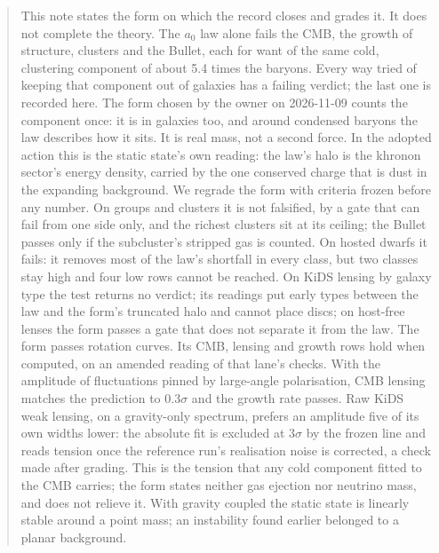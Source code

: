 \documentclass[10pt]{article}
\begin{document}
\begin{abstract}\noindent
This note states the form on which the record closes and grades it. It does not complete the theory.
The $a_0$ law alone fails the CMB, the growth of structure, clusters and the Bullet, each for want of the same cold, clustering component of about 5.4 times the baryons.
Every way tried of keeping that component out of galaxies has a failing verdict; the last one is recorded here.
The form chosen by the owner on 2026-11-09 counts the component once: it is in galaxies too, and around condensed baryons the law describes how it sits. It is real mass, not a second force.
In the adopted action this is the static state's own reading: the law's halo is the khronon sector's energy density, carried by the one conserved charge that is dust in the expanding background.
We regrade the form with criteria frozen before any number.
On groups and clusters it is not falsified, by a gate that can fail from one side only, and the richest clusters sit at its ceiling; the Bullet passes only if the subcluster's stripped gas is counted.
On hosted dwarfs it fails: it removes most of the law's shortfall in every class, but two classes stay high and four low rows cannot be reached.
On KiDS lensing by galaxy type the test returns no verdict; its readings put early types between the law and the form's truncated halo and cannot place discs; on host-free lenses the form passes a gate that does not separate it from the law.
The form passes rotation curves. Its CMB, lensing and growth rows hold when computed, on an amended reading of that lane's checks. With the amplitude of fluctuations pinned by large-angle polarisation, CMB lensing matches the prediction to 0.3$\sigma$ and the growth rate passes. Raw KiDS weak lensing, on a gravity-only spectrum, prefers an amplitude five of its own widths lower: the absolute fit is excluded at 3$\sigma$ by the frozen line and reads tension once the reference run's realisation noise is corrected, a check made after grading. This is the tension that any cold component fitted to the CMB carries; the form states neither gas ejection nor neutrino mass, and does not relieve it.
With gravity coupled the static state is linearly stable around a point mass; an instability found earlier belonged to a planar background.


\end{abstract}
\end{document}
